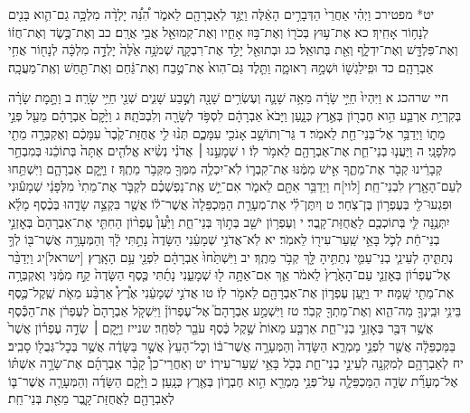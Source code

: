 \documentclass[twoside, openany, parskip=half, 11pt]{book}
\begin{document}
יט* מפטירכ וַיְהִ֗י אַחֲרֵי֙ הַדְּבָרִ֣ים הָאֵ֔לֶּה וַיֻּגַּ֥ד לְאַבְרָהָ֖ם לֵאמֹ֑ר הִ֠נֵּ֠ה יָלְדָ֨ה מִלְכָּ֥ה גַם־הִ֛וא בָּנִ֖ים לְנָח֥וֹר אָחִֽיךָ׃ כא אֶת־ע֥וּץ בְּכֹר֖וֹ וְאֶת־בּ֣וּז אָחִ֑יו וְאֶת־קְמוּאֵ֖ל אֲבִ֥י אֲרָֽם׃ כב וְאֶת־כֶּ֣שֶׂד וְאֶת־חֲז֔וֹ וְאֶת־פִּלְדָּ֖שׁ וְאֶת־יִדְלָ֑ף וְאֵ֖ת בְּתוּאֵֽל׃ כג וּבְתוּאֵ֖ל יָלַ֣ד אֶת־רִבְקָ֑ה שְׁמֹנָ֥ה אֵ֙לֶּה֙ יָלְדָ֣ה מִלְכָּ֔ה לְנָח֖וֹר אֲחִ֥י אַבְרָהָֽם׃ כד וּפִֽילַגְשׁ֖וֹ וּשְׁמָ֣הּ רְאוּמָ֑ה וַתֵּ֤לֶד גַּם־הִוא֙ אֶת־טֶ֣בַח וְאֶת־גַּ֔חַם וְאֶת־תַּ֖חַשׁ וְאֶֽת־מַעֲכָֽה׃

חיי שרהכג א וַיִּהְיוּ֙ חַיֵּ֣י שָׂרָ֔ה מֵאָ֥ה שָׁנָ֛ה וְעֶשְׂרִ֥ים שָׁנָ֖ה וְשֶׁ֣בַע שָׁנִ֑ים שְׁנֵ֖י חַיֵּ֥י שָׂרָֽה׃ ב וַתָּ֣מׇת שָׂרָ֗ה בְּקִרְיַ֥ת אַרְבַּ֛ע הִ֥וא חֶבְר֖וֹן בְּאֶ֣רֶץ כְּנָ֑עַן וַיָּבֹא֙ אַבְרָהָ֔ם לִסְפֹּ֥ד לְשָׂרָ֖ה וְלִבְכֹּתָֽהּ׃ ג וַיָּ֙קׇם֙ אַבְרָהָ֔ם מֵעַ֖ל פְּנֵ֣י מֵת֑וֹ וַיְדַבֵּ֥ר אֶל־בְּנֵי־חֵ֖ת לֵאמֹֽר׃ ד גֵּר־וְתוֹשָׁ֥ב אָנֹכִ֖י עִמָּכֶ֑ם תְּנ֨וּ לִ֤י אֲחֻזַּת־קֶ֙בֶר֙ עִמָּכֶ֔ם וְאֶקְבְּרָ֥ה מֵתִ֖י מִלְּפָנָֽי׃ ה וַיַּעֲנ֧וּ בְנֵי־חֵ֛ת אֶת־אַבְרָהָ֖ם לֵאמֹ֥ר לֽוֹ׃ ו שְׁמָעֵ֣נוּ ׀ אֲדֹנִ֗י נְשִׂ֨יא אֱלֹהִ֤ים אַתָּה֙ בְּתוֹכֵ֔נוּ בְּמִבְחַ֣ר קְבָרֵ֔ינוּ קְבֹ֖ר אֶת־מֵתֶ֑ךָ אִ֣ישׁ מִמֶּ֔נּוּ אֶת־קִבְר֛וֹ לֹֽא־יִכְלֶ֥ה מִמְּךָ֖ מִקְּבֹ֥ר מֵתֶֽךָ׃ ז וַיָּ֧קׇם אַבְרָהָ֛ם וַיִּשְׁתַּ֥חוּ לְעַם־הָאָ֖רֶץ לִבְנֵי־חֵֽת׃ [לוי]ח וַיְדַבֵּ֥ר אִתָּ֖ם לֵאמֹ֑ר אִם־יֵ֣שׁ אֶֽת־נַפְשְׁכֶ֗ם לִקְבֹּ֤ר אֶת־מֵתִי֙ מִלְּפָנַ֔י שְׁמָע֕וּנִי וּפִגְעוּ־לִ֖י בְּעֶפְר֥וֹן בֶּן־צֹֽחַר׃ ט וְיִתֶּן־לִ֗י אֶת־מְעָרַ֤ת הַמַּכְפֵּלָה֙ אֲשֶׁר־ל֔וֹ אֲשֶׁ֖ר בִּקְצֵ֣ה שָׂדֵ֑הוּ בְּכֶ֨סֶף מָלֵ֜א יִתְּנֶ֥נָּה לִּ֛י בְּתוֹכְכֶ֖ם לַאֲחֻזַּת־קָֽבֶר׃ י וְעֶפְר֥וֹן יֹשֵׁ֖ב בְּת֣וֹךְ בְּנֵי־חֵ֑ת וַיַּ֩עַן֩ עֶפְר֨וֹן הַחִתִּ֤י אֶת־אַבְרָהָם֙ בְּאׇזְנֵ֣י בְנֵי־חֵ֔ת לְכֹ֛ל בָּאֵ֥י שַֽׁעַר־עִיר֖וֹ לֵאמֹֽר׃ יא לֹֽא־אֲדֹנִ֣י שְׁמָעֵ֔נִי הַשָּׂדֶה֙ נָתַ֣תִּי לָ֔ךְ וְהַמְּעָרָ֥ה אֲשֶׁר־בּ֖וֹ לְךָ֣ נְתַתִּ֑יהָ לְעֵינֵ֧י בְנֵי־עַמִּ֛י נְתַתִּ֥יהָ לָּ֖ךְ קְבֹ֥ר מֵתֶֽךָ׃ יב וַיִּשְׁתַּ֙חוּ֙ אַבְרָהָ֔ם לִפְנֵ֖י עַ֥ם הָאָֽרֶץ׃ [ישראל]יג וַיְדַבֵּ֨ר אֶל־עֶפְר֜וֹן בְּאׇזְנֵ֤י עַם־הָאָ֙רֶץ֙ לֵאמֹ֔ר אַ֛ךְ אִם־אַתָּ֥ה ל֖וּ שְׁמָעֵ֑נִי נָתַ֜תִּי כֶּ֤סֶף הַשָּׂדֶה֙ קַ֣ח מִמֶּ֔נִּי וְאֶקְבְּרָ֥ה אֶת־מֵתִ֖י שָֽׁמָּה׃ יד וַיַּ֧עַן עֶפְר֛וֹן אֶת־אַבְרָהָ֖ם לֵאמֹ֥ר לֽוֹ׃ טו אֲדֹנִ֣י שְׁמָעֵ֔נִי אֶ֩רֶץ֩ אַרְבַּ֨ע מֵאֹ֧ת שֶֽׁקֶל־כֶּ֛סֶף בֵּינִ֥י וּבֵֽינְךָ֖ מַה־הִ֑וא וְאֶת־מֵתְךָ֖ קְבֹֽר׃ טז וַיִּשְׁמַ֣ע אַבְרָהָם֮ אֶל־עֶפְרוֹן֒ וַיִּשְׁקֹ֤ל אַבְרָהָם֙ לְעֶפְרֹ֔ן אֶת־הַכֶּ֕סֶף אֲשֶׁ֥ר דִּבֶּ֖ר בְּאׇזְנֵ֣י בְנֵי־חֵ֑ת אַרְבַּ֤ע מֵאוֹת֙ שֶׁ֣קֶל כֶּ֔סֶף עֹבֵ֖ר לַסֹּחֵֽר׃ שנייז וַיָּ֣קׇם ׀ שְׂדֵ֣ה עֶפְר֗וֹן אֲשֶׁר֙ בַּמַּכְפֵּלָ֔ה אֲשֶׁ֖ר לִפְנֵ֣י מַמְרֵ֑א הַשָּׂדֶה֙ וְהַמְּעָרָ֣ה אֲשֶׁר־בּ֔וֹ וְכׇל־הָעֵץ֙ אֲשֶׁ֣ר בַּשָּׂדֶ֔ה אֲשֶׁ֥ר בְּכׇל־גְּבֻל֖וֹ סָבִֽיב׃ יח לְאַבְרָהָ֥ם לְמִקְנָ֖ה לְעֵינֵ֣י בְנֵי־חֵ֑ת בְּכֹ֖ל בָּאֵ֥י שַֽׁעַר־עִירֽוֹ׃ יט וְאַחֲרֵי־כֵן֩ קָבַ֨ר אַבְרָהָ֜ם אֶת־שָׂרָ֣ה אִשְׁתּ֗וֹ אֶל־מְעָרַ֞ת שְׂדֵ֧ה הַמַּכְפֵּלָ֛ה עַל־פְּנֵ֥י מַמְרֵ֖א הִ֣וא חֶבְר֑וֹן בְּאֶ֖רֶץ כְּנָֽעַן׃ כ וַיָּ֨קׇם הַשָּׂדֶ֜ה וְהַמְּעָרָ֧ה אֲשֶׁר־בּ֛וֹ לְאַבְרָהָ֖ם לַאֲחֻזַּת־קָ֑בֶר מֵאֵ֖ת בְּנֵי־חֵֽת׃
\end{document}
